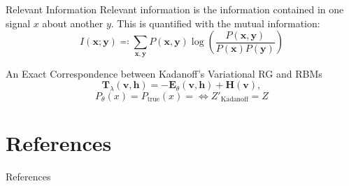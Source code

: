 \documentclass{beamer}
\newcommand{\bolds}[1]{\boldsymbol{#1}}
\newcommand{\bh}{\bolds{h}}
\newcommand{\bv}{\bolds{v}}
\newcommand{\bx}{\bolds{x}}
\newcommand{\by}{\bolds{y}}
\newcommand{\bT}{\bolds{T}}
\renewcommand{\l}{\lambda}
\begin{document}
\begin{frame}{Relevant Information}
  Relevant information is the information contained in one signal $x$
  about another $y$. This is quantified with the mutual information:%
  \begin{equation}%
    \boxed{I(\bx; \by)\eqcolon\sum_{\bx,\by}P(\bx,\by)\log\left(\frac{P(\bx,\by)}{P(\bx)P(\by)}\right)}
  \end{equation}%
\end{frame}


\begin{frame}{An Exact Correspondence between Kadanoff's Variational
    RG and RBMs}
\begin{equation}
  \bT_\l(\bv, \bh)=-\bolds{E}_\theta(\bv,\bh)+\bolds{H}(\bv),
\end{equation}
  \begin{equation}%
P_\theta(x)=P_{\text{true}}(x)=\iff Z'_{\text{Kadanoff}}=Z
  \end{equation}%
\end{frame}



\section{References}
\begin{frame}{References}
 
\end{frame}
\end{document}
